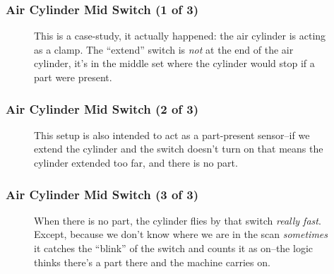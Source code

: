\begin{frame}
    \frametitle{Air Cylinder Mid Switch (1 of 3)}

    \begin{figure}
        \centering
        \resizebox{0.5\linewidth}{!}{
            
        }

        \vspace{0.5em}
        {\footnotesize This is a case-study, it actually happened: the air cylinder is acting as a clamp. The ``extend'' switch is \emph{not} at the end of the air cylinder, it's in the middle set where the cylinder would stop if a part were present.\par}
    \end{figure}
\end{frame}

\begin{frame}
    \frametitle{Air Cylinder Mid Switch (2 of 3)}

    \begin{figure}
        \centering
        \resizebox{0.5\linewidth}{!}{
            
        }

        \vspace{0.5em}
        {\footnotesize This setup is also intended to act as a part-present sensor--if we extend the cylinder and the switch doesn't turn on that means the cylinder extended too far, and there is no part.\par}
    \end{figure}
\end{frame}

\begin{frame}
    \frametitle{Air Cylinder Mid Switch (3 of 3)}

    \begin{figure}
        \centering
        \resizebox{0.5\linewidth}{!}{
            
        }

        \vspace{0.5em}
        {\footnotesize When there is no part, the cylinder flies by that switch \emph{really fast}. Except, because we don't know where we are in the scan \emph{sometimes} it catches the ``blink'' of the switch and counts it as on--the logic thinks there's a part there and the machine carries on.\par}
    \end{figure}
\end{frame}

